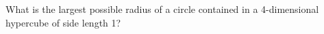 What is the largest possible radius of a circle contained in a 4-dimensional
hypercube of side length 1?
